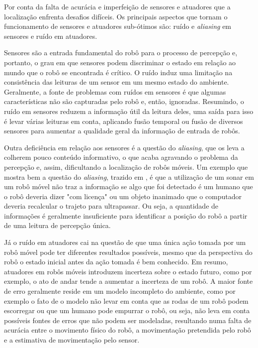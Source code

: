 \documentclass[acronym, symbols, table]{fei}
\begin{document}
			Por conta da falta de acurácia e imperfeição de sensores e atuadores que a localização enfrenta desafios difíceis. Os principais aspectos que tornam o funcionamento de sensores e atuadores sub-ótimos são: ruído e \textit{aliasing} em sensores e ruído em atuadores.
			
			Sensores são a entrada fundamental do robô para o processo de percepção	e, portanto, o grau em que sensores podem discriminar o estado em relação ao mundo que o robô se encontrada é crítico. O ruído induz uma limitação na consistência das leituras de um sensor em um mesmo estado do ambiente. Geralmente, a fonte de problemas com ruídos em sensores é que algumas características não são capturadas pelo robô e, então, ignoradas. Resumindo, o ruído em sensores reduzem a informação útil da leitura deles, uma saída para isso é levar várias leituras em conta, aplicando fusão temporal ou fusão de diversos sensores para aumentar a qualidade geral da informação de entrada de robôs.
			
			Outra deficiência em relação aos sensores é a questão do \textit{aliasing}, que os leva a colherem pouco conteúdo informativo, o que acaba agravando o problema da percepção e, assim, dificultando a localização de robôs móveis. Um exemplo que mostra bem a questão do \textit{aliasing}, trazido em \textcite{siegwart2011introduction}, é que a utilização de um sonar em um robô móvel não traz a informação se algo que foi detectado é um humano que o robô deveria dizer "com licença" ou um objeto inanimado que o computador deveria recalcular o trajeto para ultrapassar. Ou seja, a quantidade de informações é geralmente insuficiente para identificar a posição do robô a partir de uma leitura de percepção única.
			
			Já o ruído em atuadores cai na questão de que uma única ação tomada por um robô móvel pode ter diferentes resultados possíveis, mesmo que da perspectiva do robô o estado inicial antes da ação tomada é bem conhecido. Em resumo, atuadores em robôs móveis introduzem incerteza sobre o estado futuro, como por exemplo, o ato de andar tende a aumentar a incerteza de um robô. A maior fonte de erro geralmente reside em um modelo incompleto do ambiente, como por exemplo o fato de o modelo não levar em conta que as rodas de um robô podem escorregar ou que um humano pode empurrar o robô, ou seja, não leva em conta possíveis fontes de erros que não podem ser modeladas, resultando numa falta de acurácia entre o movimento físico do robô, a movimentação pretendida pelo robô e a estimativa de movimentação pelo sensor.
		
\end{document}
